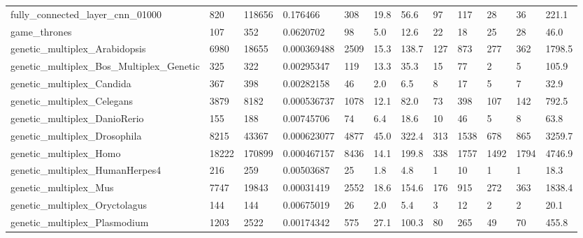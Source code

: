 \begin{longtable}{llllllllllll}
 fully\_connected\_layer\_cnn\_01000                    & 820        & 118656    & 0.176466    & 308   & 19.8   & 56.6   & 97    & 117    & 28     & 36     & 221.1   \\
 game\_thrones                                       & 107        & 352       & 0.0620702   & 98    & 5.0    & 12.6   & 22    & 18     & 25     & 28     & 46.0    \\
 genetic\_multiplex\_Arabidopsis                      & 6980       & 18655     & 0.000369488 & 2509  & 15.3   & 138.7  & 127   & 873    & 277    & 362    & 1798.5  \\
 genetic\_multiplex\_Bos\_Multiplex\_Genetic            & 325        & 322       & 0.00295347  & 119   & 13.3   & 35.3   & 15    & 77     & 2      & 5      & 105.9   \\
 genetic\_multiplex\_Candida                          & 367        & 398       & 0.00282158  & 46    & 2.0    & 6.5    & 8     & 17     & 5      & 7      & 32.9    \\
 genetic\_multiplex\_Celegans                         & 3879       & 8182      & 0.000536737 & 1078  & 12.1   & 82.0   & 73    & 398    & 107    & 142    & 792.5   \\
 genetic\_multiplex\_DanioRerio                       & 155        & 188       & 0.00745706  & 74    & 6.4    & 18.6   & 10    & 46     & 5      & 8      & 63.8    \\
 genetic\_multiplex\_Drosophila                       & 8215       & 43367     & 0.000623077 & 4877  & 45.0   & 322.4  & 313   & 1538   & 678    & 865    & 3259.7  \\
 genetic\_multiplex\_Homo                             & 18222      & 170899    & 0.000467157 & 8436  & 14.1   & 199.8  & 338   & 1757   & 1492   & 1794   & 4746.9  \\
 genetic\_multiplex\_HumanHerpes4                     & 216        & 259       & 0.00503687  & 25    & 1.8    & 4.8    & 1     & 10     & 1      & 1      & 18.3    \\
 genetic\_multiplex\_Mus                              & 7747       & 19843     & 0.00031419  & 2552  & 18.6   & 154.6  & 176   & 915    & 272    & 363    & 1838.4  \\
 genetic\_multiplex\_Oryctolagus                      & 144        & 144       & 0.00675019  & 26    & 2.0    & 5.4    & 3     & 12     & 2      & 2      & 20.1    \\
 genetic\_multiplex\_Plasmodium                       & 1203       & 2522      & 0.00174342  & 575   & 27.1   & 100.3  & 80    & 265    & 49     & 70     & 455.8   \\

\end{longtable}
